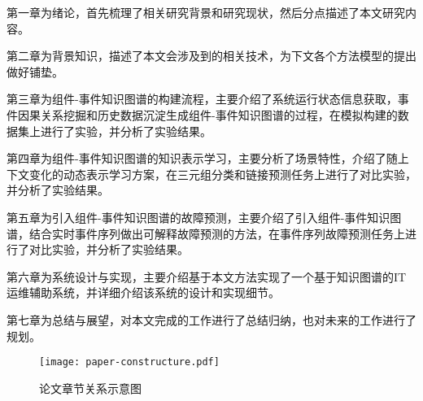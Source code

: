 第一章为绪论，首先梳理了相关研究背景和研究现状，然后分点描述了本文研究内容。

第二章为背景知识，描述了本文会涉及到的相关技术，为下文各个方法模型的提出做好铺垫。

第三章为组件-事件知识图谱的构建流程，主要介绍了系统运行状态信息获取，事件因果关系挖掘和历史数据沉淀生成组件-事件知识图谱的过程，在模拟构建的数据集上进行了实验，并分析了实验结果。

第四章为组件-事件知识图谱的知识表示学习，主要分析了场景特性，介绍了随上下文变化的动态表示学习方案，在三元组分类和链接预测任务上进行了对比实验，并分析了实验结果。

第五章为引入组件-事件知识图谱的故障预测，主要介绍了引入组件-事件知识图谱，结合实时事件序列做出可解释故障预测的方法，在事件序列故障预测任务上进行了对比实验，并分析了实验结果。

第六章为系统设计与实现，主要介绍基于本文方法实现了一个基于知识图谱的IT运维辅助系统，并详细介绍该系统的设计和实现细节。

第七章为总结与展望，对本文完成的工作进行了总结归纳，也对未来的工作进行了规划。
\begin{figure}[htbp]
    \centering
    \texttt{[image: paper-constructure.pdf]}
    \caption{论文章节关系示意图\label{paper-constructure}}
\end{figure}






